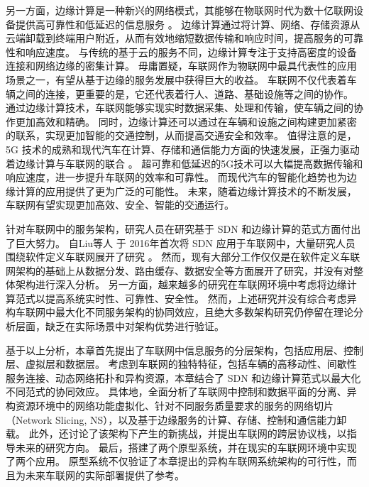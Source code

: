 另一方面，边缘计算是一种新兴的网络模式，其能够在物联网时代为数十亿联网设备提供高可靠性和低延迟的信息服务 \cite{shi2016edge}。
边缘计算通过将计算、网络、存储资源从云端卸载到终端用户附近，从而有效地缩短数据传输和响应时间，提高服务的可靠性和响应速度。
与传统的基于云的服务不同，边缘计算专注于支持高密度的设备连接和网络边缘的密集计算。
毋庸置疑，车联网作为物联网中最具代表性的应用场景之一，有望从基于边缘的服务发展中获得巨大的收益。
车联网不仅代表着车辆之间的连接，更重要的是，它还代表着行人、道路、基础设施等之间的协作。
通过边缘计算技术，车联网能够实现实时数据采集、处理和传输，使车辆之间的协作更加高效和精确。
同时，边缘计算还可以通过在车辆和设施之间构建更加紧密的联系，实现更加智能的交通控制，从而提高交通安全和效率。
值得注意的是，5G 技术的成熟和现代汽车在计算、存储和通信能力方面的快速发展，正强力驱动着边缘计算与车联网的联合 \cite{li2021che}。
超可靠和低延迟的5G技术可以大幅提高数据传输和响应速度，进一步提升车联网的效率和可靠性。
而现代汽车的智能化趋势也为边缘计算的应用提供了更为广泛的可能性。
未来，随着边缘计算技术的不断发展，车联网有望实现更加高效、安全、智能的交通运行。

针对车联网中的服务架构，研究人员在研究基于 SDN 和边缘计算的范式方面付出了巨大努力。
自Liu等人 \cite{liu2016cooperative} 于 2016年首次将 SDN 应用于车联网中，大量研究人员围绕软件定义车联网展开了研究 \cite{dai2018cooperative, luo2018sdnmac, liu2018coding, zhang2022ac-sdvn, zhao2022elite, lin2023alps, ahmed2023deep}。
然而，现有大部分工作仅仅是在软件定义车联网架构的基础上从数据分发、路由缓存、数据安全等方面展开了研究，并没有对整体架构进行深入分析。
另一方面，越来越多的研究在车联网环境中考虑将边缘计算范式以提高系统实时性、可靠性、安全性\cite{liu2017a, lang2022cooperative, liu2021fog, dai2021edge, zhang2022digital, liu2020adaptive, liao2021learning, liu2023mobility, liu2023asynchronous}。
然而，上述研究并没有综合考虑异构车联网中最大化不同服务架构的协同效应，且绝大多数架构研究仍停留在理论分析层面，缺乏在实际场景中对架构优势进行验证。

基于以上分析，本章首先提出了车联网中信息服务的分层架构，包括应用层、控制层、虚拟层和数据层。
考虑到车联网的独特特征，包括车辆的高移动性、间歇性服务连接、动态网络拓扑和异构资源，本章结合了 SDN 和边缘计算范式以最大化不同范式的协同效应。
具体地，全面分析了车联网中控制和数据平面的分离、异构资源环境中的网络功能虚拟化、针对不同服务质量要求的服务的网络切片（Network Slicing, NS），以及基于边缘服务的计算、存储、控制和通信能力卸载。
此外，还讨论了该架构下产生的新挑战，并提出车联网的跨层协议栈，以指导未来的研究方向。
最后，搭建了两个原型系统，并在现实的车联网环境中实现了两个应用。
原型系统不仅验证了本章提出的异构车联网系统架构的可行性，而且为未来车联网的实际部署提供了参考。

